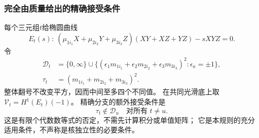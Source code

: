 \documentclass[11pt,a4paper,oneside]{ctexart}
\theoremstyle{cnplain}
\theoremstyle{definition}
\theoremstyle{remark}
\numberwithin{equation}{section}
\begin{document}
\subsubsection{完全由质量给出的精确接受条件}
每个三元组$t$给椭圆曲线
\[
 E_t(s):\
 (\mu_{1i_1}X+\mu_{2i_2}Y+\mu_{3i_3}Z)(XY+XZ+YZ)-sXYZ=0.
\]
令
\begin{align}
 \mathcal D_t&=\{0,\infty\}\cup
 \{(\epsilon_1m_{1i_1}+\epsilon_2m_{2i_2}
                       +\epsilon_3m_{3i_3})^2:\epsilon_a=\pm1\},\label{unified:eq:thetadiscr}\\
 \tau_t&=(m_{1i_1}+m_{2i_2}+m_{3i_3})^2 .\nonumber
\end{align}
整体翻号不改变平方，因而中间至多四个不同值。
在共同光滑底上取$\mathcal V_t=H^1(E_t)(-1)$。
精确分支的额外接受条件是
\begin{equation}\label{unified:eq:thetaprivate}
             \tau_t\notin\mathcal D_u\quad\text{对所有 }t\ne u .
\end{equation}
这是有限个代数数等式的否定，不需先计算积分或单值矩阵；
它是本规则的充分适用条件，不声称是核独立性的必要条件。
\end{document}
